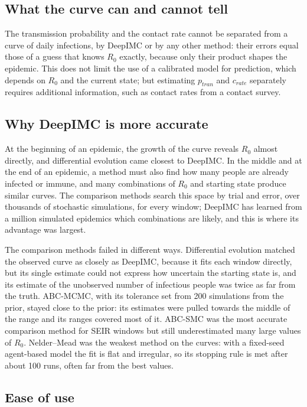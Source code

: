 \documentclass[12pt]{article}
\begin{document}
\subsection{What the curve can and cannot tell}

The transmission probability and the contact rate cannot be separated from a curve of daily
infections, by DeepIMC or by any other method: their errors equal those of a guess that knows $R_0$
exactly, because only their product shapes the epidemic. This does not limit the use of a calibrated
model for prediction, which depends on $R_0$ and the current state; but estimating $p_{tran}$ and
$c_{rate}$ separately requires additional information, such as contact rates from a contact survey.

\subsection{Why DeepIMC is more accurate}

At the beginning of an epidemic, the growth of the curve reveals $R_0$ almost directly, and differential
evolution came closest to DeepIMC. In the middle and at the end of an epidemic, a method must also find
how many people are already infected or immune, and many combinations of $R_0$ and starting state produce
similar curves. The comparison methods search this space by trial and error, over thousands of stochastic
simulations, for every window; DeepIMC has learned from a million simulated epidemics which combinations are
likely, and this is where its advantage was largest.

The comparison methods failed in different ways. Differential evolution matched the observed curve as closely
as DeepIMC, because it fits each window directly, but its single estimate could not express how uncertain the
starting state is, and its estimate of the unobserved number of infectious people was twice as far from the
truth. ABC-MCMC, with its tolerance set from 200 simulations from the prior, stayed close to the prior: its
estimates were pulled towards the middle of the range and its ranges covered most of it. ABC-SMC was the most
accurate comparison method for SEIR windows but still underestimated many large values of $R_0$. Nelder--Mead
was the weakest method on the curves: with a fixed-seed agent-based model the fit is flat and irregular, so its
stopping rule is met after about 100 runs, often far from the best values.

\subsection{Ease of use}
\end{document}
